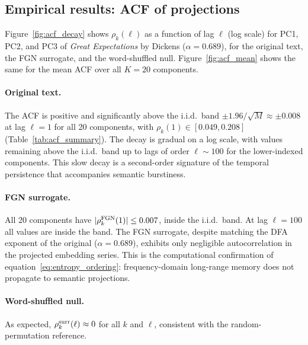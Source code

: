 \documentclass[12pt,a4paper]{article}
\begin{document}
\subsection{Empirical results: ACF of projections}
\label{sec:acf_results}

Figure~\ref{fig:acf_decay} shows $\rho_k(\ell)$ as a function of lag
$\ell$ (log scale) for PC1, PC2, and PC3 of
\emph{Great Expectations} by Dickens ($\alpha = 0.689$), for the original text, the FGN surrogate, and
the word-shuffled null.
Figure~\ref{fig:acf_mean} shows the same for the mean ACF over all
$K = 20$ components.

\paragraph{Original text.}
The ACF is positive and significantly above the i.i.d.\ band
$\pm 1.96/\sqrt{M} \approx \pm 0.008$ at lag $\ell = 1$ for all 20
components, with $\rho_k(1) \in [0.049, 0.208]$
(Table~\ref{tab:acf_summary}).
The decay is gradual on a log scale, with values remaining above the
i.i.d.\ band up to lags of order $\ell \sim 100$ for the
lower-indexed components.
This slow decay is a second-order signature of the temporal
persistence that accompanies semantic burstiness.

\paragraph{FGN surrogate.}
All 20 components have $|\rho_k^{\rm FGN}(1)| \le 0.007$, inside the
i.i.d.\ band.
At lag $\ell = 100$ all values are inside the band.
The FGN surrogate, despite matching the DFA exponent of the original
($\alpha = 0.689$), exhibits only negligible autocorrelation in the projected
embedding series.
This is the computational confirmation of
equation~\eqref{eq:entropy_ordering}: frequency-domain long-range
memory does not propagate to semantic projections.

\paragraph{Word-shuffled null.}
As expected, $\rho_k^{\rm surr}(\ell) \approx 0$ for all $k$ and
$\ell$, consistent with the random-permutation reference.
\end{document}
